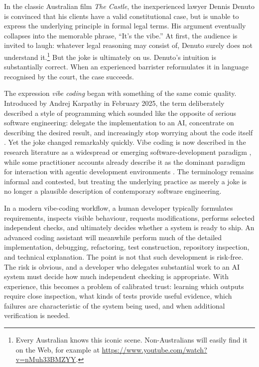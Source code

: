 \documentclass[12pt]{article}
\begin{document}
In the classic Australian film \emph{The Castle}, the inexperienced lawyer Dennis Denuto is convinced that his clients have a valid constitutional case, but is unable to express the underlying principle in formal legal terms. His argument eventually collapses into the memorable phrase, ``It's the vibe.'' At first, the audience is invited to laugh: whatever legal reasoning may consist of, Denuto surely does not understand it.\footnote{Every Australian knows this iconic scene. Non-Australians will easily find it on the Web, for example at \url{https://www.youtube.com/watch?v=nMuh33BMZYY}.} But the joke is ultimately on us. Denuto's intuition is substantially correct. When an experienced barrister reformulates it in language recognised by the court, the case succeeds.

The expression \emph{vibe coding} began with something of the same comic quality. Introduced by Andrej Karpathy in February 2025, the term deliberately described a style of programming which sounded like the opposite of serious software engineering: delegate the implementation to an AI, concentrate on describing the desired result, and increasingly stop worrying about the code itself \citep{fowler2026vibecoding}.
Yet the joke changed remarkably quickly. Vibe coding is now described in the research literature as a widespread or emerging software-development paradigm \citep{meskeEtAl2025vibecoding,sarkarDrosos2025vibecoding}, while some practitioner accounts already describe it as the dominant paradigm for interaction with agentic development environments \citep{nimblabs2026vibecoding}. The terminology remains informal and contested, but treating the underlying practice as merely a joke is no longer a plausible description of contemporary software engineering.

In a modern vibe-coding workflow, a human developer typically formulates requirements, inspects visible behaviour, requests modifications, performs selected independent checks, and ultimately decides whether a system is ready to ship. An advanced coding assistant will meanwhile perform much of the detailed implementation, debugging, refactoring, test construction, repository inspection, and technical explanation.
The point is not that such development is risk-free. The risk is obvious, and a developer who delegates substantial work to an AI system must decide how much independent checking is appropriate. With experience, this becomes a problem of calibrated trust: learning which outputs require close inspection, what kinds of tests provide useful evidence, which failures are characteristic of the system being used, and when additional verification is needed.
\end{document}
